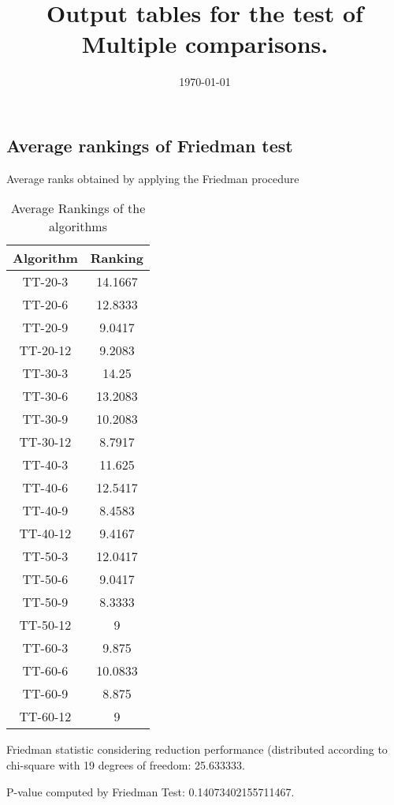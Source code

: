 \documentclass[a4paper,10pt]{article}
\title{Output tables for the test of Multiple comparisons.}
\author{}
\date{\today}
\begin{document}
\begin{landscape}
\pagestyle{empty}
\maketitle
\thispagestyle{empty}
\section{Average rankings of Friedman test}



Average ranks obtained by applying the Friedman procedure

\begin{table}[!htp]
\centering
\begin{tabular}{|c|c|}\hline
Algorithm&Ranking\\\hline
TT-20-3 & 14.1667\\
TT-20-6 & 12.8333\\
TT-20-9 & 9.0417\\
TT-20-12 & 9.2083\\
TT-30-3 & 14.25\\
TT-30-6 & 13.2083\\
TT-30-9 & 10.2083\\
TT-30-12 & 8.7917\\
TT-40-3 & 11.625\\
TT-40-6 & 12.5417\\
TT-40-9 & 8.4583\\
TT-40-12 & 9.4167\\
TT-50-3 & 12.0417\\
TT-50-6 & 9.0417\\
TT-50-9 & 8.3333\\
TT-50-12 & 9\\
TT-60-3 & 9.875\\
TT-60-6 & 10.0833\\
TT-60-9 & 8.875\\
TT-60-12 & 9\\
\hline
\end{tabular}
\caption{Average Rankings of the algorithms}
\end{table}

Friedman statistic considering reduction performance (distributed according to chi-square with 19 degrees of freedom: 25.633333.

P-value computed by Friedman Test: 0.14073402155711467.\newline



\pagebreak


\end{landscape}
\end{document}
